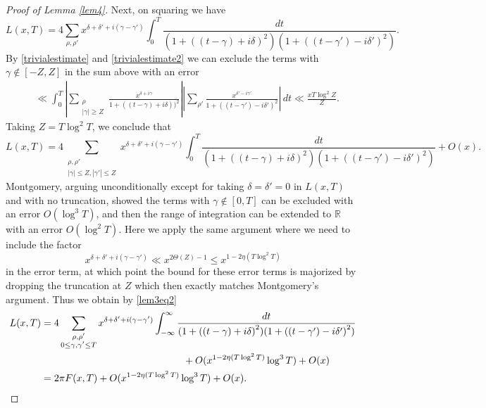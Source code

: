 \documentclass{amsart}
\newcommand{\1}{\mathbbm{1}}
\theoremstyle{remark}
\numberwithin{equation}{section}
\begin{document}
\begin{proof}[Proof of Lemma \ref{lem4}]
Next, on squaring we have
\[ L(x,T) = 4 \sum_{\rho, \rho'} x^{\delta+\delta'+i(\gamma-\gamma')} \int_0^T \frac{dt}{(1+ \left((t-\gamma)+i\delta\right)^2)(1+ \left((t-\gamma')-i\delta'\right)^2)}. \]
By \eqref{trivialestimate} and \eqref{trivialestimate2} we can exclude the terms with $\gamma \not \in [-Z,Z]$ in the sum above with an error 
\[\begin{split} &\ll \int_0^T \left|\sum_{\substack{ \rho \\ |\gamma| \ge Z}}\frac{x^{\delta+i\gamma}}{1+((t-\gamma)+i\delta))^2}\right|\left|\sum_{ \rho'}\frac{x^{\delta'-i\gamma'}}{1+((t-\gamma')-i\delta')^2}\right|\, dt 
\ll \frac{xT\log^2Z}{Z}.\end{split} \]
Taking $Z=T \log^2 T$, we conclude that
\[ L(x,T) = 4 \sum_{\substack{\rho, \rho'\\ |\gamma|\le Z, |\gamma'|\le Z}} x^{\delta+\delta'+i(\gamma-\gamma')} \int_0^T \frac{dt}{(1+ \left((t-\gamma)+i\delta\right)^2)(1+ \left((t-\gamma')-i\delta'\right)^2)} + O(x). \]
 Montgomery, arguing unconditionally except for taking $\delta=\delta'=0$ in $L(x,T)$ and with no truncation, showed the terms with $\gamma\not \in [0,T]$ can be excluded with an error $O(\log^3 T)$, and then the range of integration can be extended to $\mathbb{R}$ with an error $O(\log^2T)$. Here we apply the same argument where we need to include the factor 
 \begin{equation}\label{xdependence} x^{\delta +\delta' +i(\gamma-\gamma')} \ll x^{2\Theta(Z)-1}\le x^{1-2\eta(T\log^2 T)}\end{equation}
in the error term, at which point the bound for these error terms is majorized by dropping the truncation at $Z$ which then exactly matches Montgomery's argument. Thus we obtain by \eqref{lem3eq2}
\[\begin{split} L(x,T) &= 4 \sum_{\substack{\rho, \rho'\\ 0\le \gamma, \gamma'\le T} } x^{\delta+\delta'+i(\gamma-\gamma')} \int_{-\infty}^{\infty} \frac{dt}{(1+ \left((t-\gamma)+i\delta\right)^2)(1+ \left((t-\gamma')-i\delta'\right)^2)} \\&
\hskip 2in +O(x^{1-2\eta(T\log^2 T)}\log^3T)+ O(x) \\&
= 2\pi F(x,T) +O(x^{1-2\eta(T\log^2 T)}\log^3T)+ O(x).
\end{split}\]
\end{proof}
\end{document}
